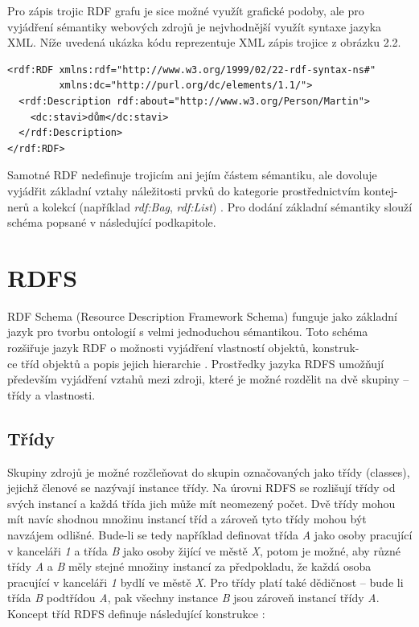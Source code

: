 \documentclass{projekt}
\begin{document}
Pro zápis trojic RDF grafu je sice možné využít grafické podoby, ale pro vyjádření sémantiky webových zdrojů je nejvhodnější využít syntaxe jazyka XML. Níže uvedená ukázka kódu reprezentuje XML zápis trojice z obrázku 2.2.

\begin{verbatim}
<rdf:RDF xmlns:rdf="http://www.w3.org/1999/02/22-rdf-syntax-ns#"
         xmlns:dc="http://purl.org/dc/elements/1.1/">
  <rdf:Description rdf:about="http://www.w3.org/Person/Martin">
    <dc:stavi>dům</dc:stavi>
  </rdf:Description>
</rdf:RDF>

\end{verbatim}

Samotné RDF nedefinuje trojicím ani jejím částem sémantiku, ale dovoluje vyjádřit základní vztahy náležitosti prvků do kategorie prostřednictvím kontej-\\nerů a kolekcí (například {\it rdf:Bag}, {\it rdf:List}) \cite{_2}. Pro dodání základní sémantiky slouží schéma popsané v následující podkapitole.

\section{RDFS}
\hspace{0.65cm}RDF Schema (Resource Description Framework Schema) funguje jako základní jazyk pro tvorbu ontologií s velmi jednoduchou sémantikou. Toto schéma rozšiřuje jazyk RDF o možnosti vyjádření vlastností objektů, konstruk-\\ce tříd objektů a popis jejich hierarchie \cite{_2}. 
Prostředky jazyka RDFS umožňují především vyjádření vztahů mezi zdroji, které je možné rozdělit na dvě skupiny – třídy a vlastnosti.

\subsection{Třídy}
\hspace{0.65cm}Skupiny zdrojů je možné rozčleňovat do skupin označovaných jako třídy (classes), jejichž členové se nazývají instance třídy. Na úrovni RDFS se rozlišují třídy od svých instancí a každá třída jich může mít neomezený počet. Dvě třídy mohou mít navíc shodnou množinu instancí tříd a zároveň tyto třídy mohou být navzájem odlišné. Bude-li se tedy například definovat třída {\it A} jako osoby pracující v kanceláři {\it 1} a třída {\it B} jako osoby žijící ve městě {\it X}, potom je možné, aby různé třídy {\it A} a {\it B} měly stejné množiny instancí za předpokladu, že každá osoba pracující v kanceláři {\it 1} bydlí ve městě {\it X}. Pro třídy platí také dědičnost – bude li třída {\it B} podtřídou {\it A}, pak všechny instance {\it B} jsou zároveň instancí třídy {\it A}. Koncept tříd RDFS definuje následující konstrukce \cite{_7}:
\end{document}
